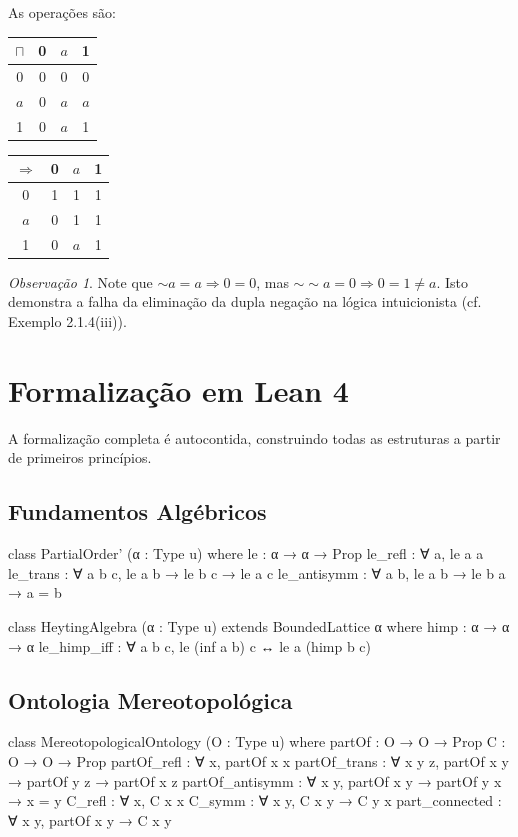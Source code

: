 \documentclass[12pt,a4paper]{article}
\theoremstyle{definition}
\theoremstyle{plain}
\theoremstyle{remark}
\newtheorem{observacao}[definicao]{Observação}
\begin{document}
As operações são:
\begin{center}
\begin{tabular}{c|ccc}
  $\sqcap$ & 0 & $a$ & 1 \\
  \hline
  0 & 0 & 0 & 0 \\
  $a$ & 0 & $a$ & $a$ \\
  1 & 0 & $a$ & 1
\end{tabular}
\qquad
\begin{tabular}{c|ccc}
  $\Rightarrow$ & 0 & $a$ & 1 \\
  \hline
  0 & 1 & 1 & 1 \\
  $a$ & 0 & 1 & 1 \\
  1 & 0 & $a$ & 1
\end{tabular}
\end{center}

\begin{observacao}
Note que $\sim a = a \Rightarrow 0 = 0$, mas $\sim\sim a = 0 \Rightarrow 0 = 1 \neq a$. Isto demonstra a falha da eliminação da dupla negação na lógica intuicionista (cf. Exemplo 2.1.4(iii)).
\end{observacao}

\section{Formalização em Lean 4}

A formalização completa é autocontida, construindo todas as estruturas a partir de primeiros princípios.

\subsection{Fundamentos Algébricos}

\begin{leancode}
class PartialOrder' (α : Type u) where
  le : α → α → Prop
  le_refl : ∀ a, le a a
  le_trans : ∀ {a b c}, le a b → le b c → le a c
  le_antisymm : ∀ {a b}, le a b → le b a → a = b

class HeytingAlgebra (α : Type u) extends BoundedLattice α where
  himp : α → α → α
  le_himp_iff : ∀ {a b c}, le (inf a b) c ↔ le a (himp b c)
\end{leancode}

\subsection{Ontologia Mereotopológica}

\begin{leancode}
class MereotopologicalOntology (O : Type u) where
  partOf : O → O → Prop
  C : O → O → Prop
  partOf_refl : ∀ x, partOf x x
  partOf_trans : ∀ {x y z}, partOf x y → partOf y z → partOf x z
  partOf_antisymm : ∀ {x y}, partOf x y → partOf y x → x = y
  C_refl : ∀ x, C x x
  C_symm : ∀ {x y}, C x y → C y x
  part_connected : ∀ {x y}, partOf x y → C x y
\end{leancode}
\end{document}
